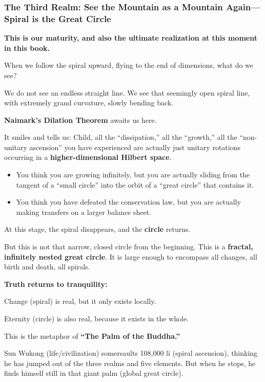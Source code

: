 \subsubsection{The Third Realm: See the Mountain as a Mountain Again---Spiral is the Great Circle}

\textbf{This is our maturity, and also the ultimate realization at this moment in this book.}

When we follow the spiral upward, flying to the end of dimensions, what do we see?

We do not see an endless straight line. We see that seemingly open spiral line, with extremely grand curvature, slowly bending back.

\textbf{Naimark's Dilation Theorem} awaits us here.

It smiles and tells us: Child, all the ``dissipation,'' all the ``growth,'' all the ``non-unitary ascension'' you have experienced are actually just unitary rotations occurring in a \textbf{higher-dimensional Hilbert space}.

\begin{itemize}
\item You think you are growing infinitely, but you are actually sliding from the tangent of a ``small circle'' into the orbit of a ``great circle'' that contains it.

\item You think you have defeated the conservation law, but you are actually making transfers on a larger balance sheet.
\end{itemize}

At this stage, the spiral disappears, and the \textbf{circle} returns.

But this is not that narrow, closed circle from the beginning. This is a \textbf{fractal, infinitely nested great circle}. It is large enough to encompass all changes, all birth and death, all spirals.

\textbf{Truth returns to tranquility:}

Change (spiral) is real, but it only exists locally.

Eternity (circle) is also real, because it exists in the whole.

This is the metaphor of \textbf{``The Palm of the Buddha.''}

Sun Wukong (life/civilization) somersaults 108,000 li (spiral ascension), thinking he has jumped out of the three realms and five elements. But when he stops, he finds himself still in that giant palm (global great circle).

